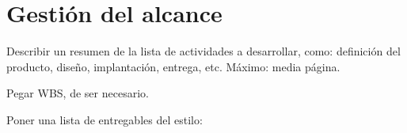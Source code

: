 \section{Gestión del alcance}
Describir un resumen de la lista de actividades a desarrollar, como: definición del producto, diseño, implantación, entrega, etc.
Máximo: media página. 

Pegar WBS, de ser necesario.

Poner una lista de entregables del estilo:

